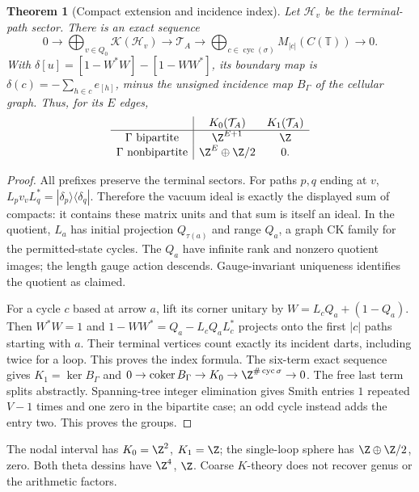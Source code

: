 \documentclass[11pt,oneside,openany]{book}
\newtheorem{theorem}{Theorem}[chapter]
\theoremstyle{definition}\newtheorem{definition}[theorem]{Definition}
\theoremstyle{remark}\newtheorem{remark}[theorem]{Remark}
\begin{document}
\begin{theorem}[Compact extension and incidence index]\label{thm:fock}
Let $\mathcal H_v$ be the terminal-path sector. There is an exact sequence
\[
 0\longrightarrow\bigoplus_{v\in Q_0}\mathcal K(\mathcal H_v)
 \longrightarrow\mathcal T_A\longrightarrow
 \bigoplus_{c\in\operatorname{cyc}(\sigma)}M_{|c|}(C(\mathbb T))\longrightarrow0.
\]
With $\delta[u]=[1-W^*W]-[1-WW^*]$, its boundary map is
$\delta(c)=-\sum_{h\in c}e_{[h]}$, minus the unsigned incidence map $B_\Gamma$ of the cellular graph. Thus, for its $E$ edges,
\[
\begin{array}{c|cc}
 &K_0(\mathcal T_A)&K_1(\mathcal T_A)\\\hline
\Gamma\text{ bipartite}&\Z^{E+1}&\Z\\
\Gamma\text{ nonbipartite}&\Z^E\oplus\Z/2&0.
\end{array}
\]
\end{theorem}
\begin{proof}
All prefixes preserve the terminal sectors. For paths $p,q$ ending at $v$, $L_pv_vL_q^*=|\delta_p\rangle\langle\delta_q|$. Therefore the vacuum ideal is exactly the displayed sum of compacts: it contains these matrix units and that sum is itself an ideal. In the quotient, $L_a$ has initial projection $Q_{\tau(a)}$ and range $Q_a$, a graph CK family for the permitted-state cycles. The $Q_a$ have infinite rank and nonzero quotient images; the length gauge action descends. Gauge-invariant uniqueness \cite[Theorem2.1]{BPRS} identifies the quotient as claimed.

For a cycle $c$ based at arrow $a$, lift its corner unitary by $W=L_cQ_a+(1-Q_a)$. Then $W^*W=1$ and $1-WW^*=Q_a-L_cQ_aL_c^*$ projects onto the first $|c|$ paths starting with $a$. Their terminal vertices count exactly its incident darts, including twice for a loop. This proves the index formula. The six-term exact sequence gives $K_1=\ker B_\Gamma$ and $0\to\operatorname{coker}B_\Gamma\to K_0\to\Z^{\#\operatorname{cyc}\sigma}\to0$. The free last term splits abstractly. Spanning-tree integer elimination gives Smith entries $1$ repeated $V-1$ times and one zero in the bipartite case; an odd cycle instead adds the entry two. This proves the groups.
\end{proof}
The nodal interval has $K_0=\Z^2$, $K_1=\Z$; the single-loop sphere has $\Z\oplus\Z/2$, zero. Both theta dessins have $\Z^4$, $\Z$. Coarse $K$-theory does not recover genus or the arithmetic factors.
\end{document}
